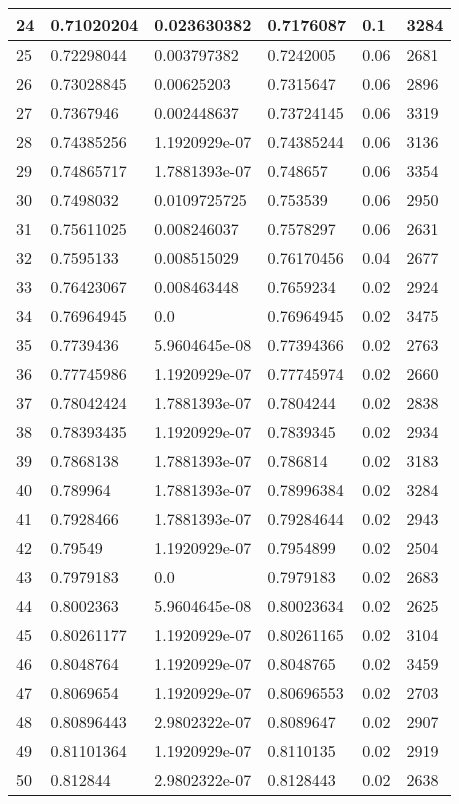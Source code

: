 \begin{longtable}{|l|l|l|l|l|l|}
24 & 0.71020204 & 0.023630382 & 0.7176087 & 0.1 & 3284 \\ \hline 
25 & 0.72298044 & 0.003797382 & 0.7242005 & 0.06 & 2681 \\ \hline 
26 & 0.73028845 & 0.00625203 & 0.7315647 & 0.06 & 2896 \\ \hline 
27 & 0.7367946 & 0.002448637 & 0.73724145 & 0.06 & 3319 \\ \hline 
28 & 0.74385256 & 1.1920929e-07 & 0.74385244 & 0.06 & 3136 \\ \hline 
29 & 0.74865717 & 1.7881393e-07 & 0.748657 & 0.06 & 3354 \\ \hline 
30 & 0.7498032 & 0.0109725725 & 0.753539 & 0.06 & 2950 \\ \hline 
31 & 0.75611025 & 0.008246037 & 0.7578297 & 0.06 & 2631 \\ \hline 
32 & 0.7595133 & 0.008515029 & 0.76170456 & 0.04 & 2677 \\ \hline 
33 & 0.76423067 & 0.008463448 & 0.7659234 & 0.02 & 2924 \\ \hline 
34 & 0.76964945 & 0.0 & 0.76964945 & 0.02 & 3475 \\ \hline 
35 & 0.7739436 & 5.9604645e-08 & 0.77394366 & 0.02 & 2763 \\ \hline 
36 & 0.77745986 & 1.1920929e-07 & 0.77745974 & 0.02 & 2660 \\ \hline 
37 & 0.78042424 & 1.7881393e-07 & 0.7804244 & 0.02 & 2838 \\ \hline 
38 & 0.78393435 & 1.1920929e-07 & 0.7839345 & 0.02 & 2934 \\ \hline 
39 & 0.7868138 & 1.7881393e-07 & 0.786814 & 0.02 & 3183 \\ \hline 
40 & 0.789964 & 1.7881393e-07 & 0.78996384 & 0.02 & 3284 \\ \hline 
41 & 0.7928466 & 1.7881393e-07 & 0.79284644 & 0.02 & 2943 \\ \hline 
42 & 0.79549 & 1.1920929e-07 & 0.7954899 & 0.02 & 2504 \\ \hline 
43 & 0.7979183 & 0.0 & 0.7979183 & 0.02 & 2683 \\ \hline 
44 & 0.8002363 & 5.9604645e-08 & 0.80023634 & 0.02 & 2625 \\ \hline 
45 & 0.80261177 & 1.1920929e-07 & 0.80261165 & 0.02 & 3104 \\ \hline 
46 & 0.8048764 & 1.1920929e-07 & 0.8048765 & 0.02 & 3459 \\ \hline 
47 & 0.8069654 & 1.1920929e-07 & 0.80696553 & 0.02 & 2703 \\ \hline 
48 & 0.80896443 & 2.9802322e-07 & 0.8089647 & 0.02 & 2907 \\ \hline 
49 & 0.81101364 & 1.1920929e-07 & 0.8110135 & 0.02 & 2919 \\ \hline 
50 & 0.812844 & 2.9802322e-07 & 0.8128443 & 0.02 & 2638 \\ \hline 
\end{longtable}